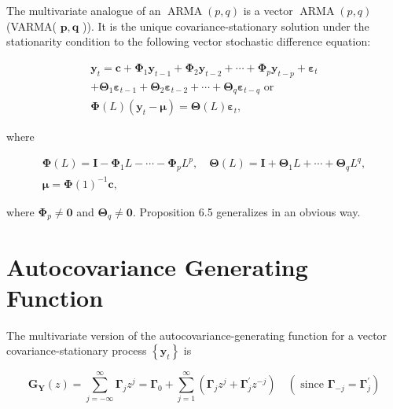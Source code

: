 \documentclass[10pt]{article}
\begin{document}
The multivariate analogue of an $\operatorname{ARMA}(p, q)$ is a vector $\operatorname{ARMA}(p, q)$ (VARMA( $\boldsymbol{p}, \boldsymbol{q}$ )). It is the unique covariance-stationary solution under the stationarity condition to the following vector stochastic difference equation:

$$
\begin{gathered}
\mathbf{y}_{t}=\mathbf{c}+\boldsymbol{\Phi}_{1} \mathbf{y}_{t-1}+\boldsymbol{\Phi}_{2} \mathbf{y}_{t-2}+\cdots+\boldsymbol{\Phi}_{p} \mathbf{y}_{t-p}+\boldsymbol{\varepsilon}_{t} \\
+\boldsymbol{\Theta}_{1} \boldsymbol{\varepsilon}_{t-1}+\boldsymbol{\Theta}_{2} \boldsymbol{\varepsilon}_{t-2}+\cdots+\boldsymbol{\Theta}_{q} \boldsymbol{\varepsilon}_{t-q} \text { or } \\
\boldsymbol{\Phi}(L)\left(\mathbf{y}_{t}-\boldsymbol{\mu}\right)=\boldsymbol{\Theta}(L) \boldsymbol{\varepsilon}_{t},
\end{gathered}
$$

where


\begin{gather*}
\boldsymbol{\Phi}(L)=\mathbf{I}-\boldsymbol{\Phi}_{1} L-\cdots-\boldsymbol{\Phi}_{p} L^{p}, \quad \boldsymbol{\Theta}(L)=\mathbf{I}+\boldsymbol{\Theta}_{1} L+\cdots+\boldsymbol{\Theta}_{q} L^{q}, \\
\boldsymbol{\mu}=\boldsymbol{\Phi}(1)^{-1} \mathbf{c}, \tag{6.3.10}
\end{gather*}


where $\boldsymbol{\Phi}_{p} \neq \mathbf{0}$ and $\boldsymbol{\Theta}_{q} \neq \mathbf{0}$. Proposition 6.5 generalizes in an obvious way.

\section*{Autocovariance Generating Function}
The multivariate version of the autocovariance-generating function for a vector covariance-stationary process $\left\{\mathbf{y}_{t}\right\}$ is


\begin{equation*}
\mathbf{G}_{\mathbf{Y}}(z)=\sum_{j=-\infty}^{\infty} \boldsymbol{\Gamma}_{j} z^{j}=\boldsymbol{\Gamma}_{0}+\sum_{j=1}^{\infty}\left(\boldsymbol{\Gamma}_{j} z^{j}+\boldsymbol{\Gamma}_{j}^{\prime} z^{-j}\right) \quad\left(\text { since } \boldsymbol{\Gamma}_{-j}=\boldsymbol{\Gamma}_{j}^{\prime}\right) \tag{6.3.11}
\end{equation*}
\end{document}
